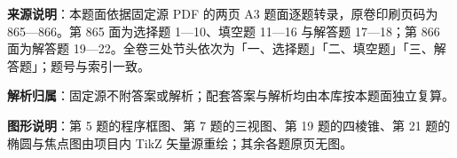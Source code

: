 

\begin{gknotice}
\textbf{来源说明}：本题面依据固定源 PDF 的两页 A3 题面逐题转录，原卷印刷页码为 865—866。第 865 面为选择题 1—10、填空题 11—16 与解答题 17—18；第 866 面为解答题 19—22。全卷三处节头依次为「一、选择题」「二、填空题」「三、解答题」；题号与索引一致。

\textbf{解析归属}：固定源不附答案或解析；配套答案与解析均由本库按本题面独立复算。

\textbf{图形说明}：第 5 题的程序框图、第 7 题的三视图、第 19 题的四棱锥、第 21 题的椭圆与焦点图由项目内 TikZ 矢量源重绘；其余各题原页无图。
\end{gknotice}


